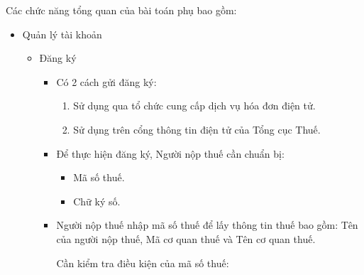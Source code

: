 Các chức năng tổng quan của bài toán phụ bao gồm:

\begin{itemize}

    \item Quản lý tài khoản

          \begin{itemize}

              \item Đăng ký

                    \begin{itemize}

                        \item Có 2 cách gửi đăng ký:

                              \begin{enumerate}

                                  \item Sử dụng qua tổ chức cung cấp dịch vụ hóa đơn điện tử.

                                  \item Sử dụng trên cổng thông tin điện tử của Tổng cục Thuế.

                              \end{enumerate}

                        \item Để thực hiện đăng ký, Người nộp thuế cần chuẩn bị:

                              \begin{itemize}

                                  \item Mã số thuế.

                                  \item Chữ ký số.

                              \end{itemize}



                        \item   Người nộp thuế nhập mã số thuế   để lấy  thông tin thuế  bao gồm:  Tên của người nộp thuế,  Mã cơ quan thuế  và  Tên cơ quan thuế.

                              \begin{note}
                                  Cần kiểm tra điều kiện của mã số thuế:


\end{note}
\end{itemize}
\end{itemize}
\end{itemize}
